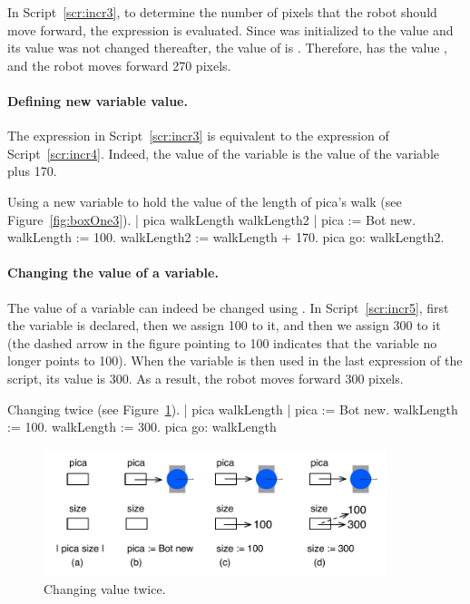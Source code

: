 \documentclass[a4paper,10pt,twoside]{book}
\begin{document}
In Script~\ref{scr:incr3}, to determine the number of pixels that the robot should move forward, the expression  is evaluated. Since  was initialized to the value  and its value was not changed thereafter, the value of  is . Therefore,  has the value , and the robot moves forward 270 pixels. 

\paragraph{Defining new variable value.}
The expression  in Script~\ref{scr:incr3} is equivalent to the expression  of Script~\ref{scr:incr4}. Indeed, the value of the variable  is the value of the variable  plus 170.

\begin{script}[incr4]{Using a new variable to hold the value of the length of pica’s walk   (see Figure~\ref{fig:boxOne3}).}
	| pica walkLength walkLength2 | 
	pica := Bot new. 
	walkLength := 100. 
	walkLength2 := walkLength + 170. 
	pica go: walkLength2. 
\end{script}


\paragraph{Changing the value of a variable.}
The value of a variable can indeed be changed using \ct{:=}. In Script~\ref{scr:incr5}, first the variable   is declared, then we assign 100 to it, and then we assign 300 to it (the dashed arrow in the figure pointing to 100 indicates that the variable no longer points to 100). When the variable is then used in the last expression of the script, its value is 300. As a result, the robot moves forward 300 pixels. 


\begin{script}[incr5]{Changing  twice (see Figure~\ref{fig:boxThree}).}
	| pica walkLength | 
	pica := Bot new. 
	walkLength := 100. 
	walkLength := 300. 
	pica go: walkLength 
\end{script}

\begin{figure}[h]
	\centerline{\includegraphics[width=10cm]{boxThree}}
	\caption{Changing  value twice.\label{fig:boxThree}}
\end{figure}
\end{document}

